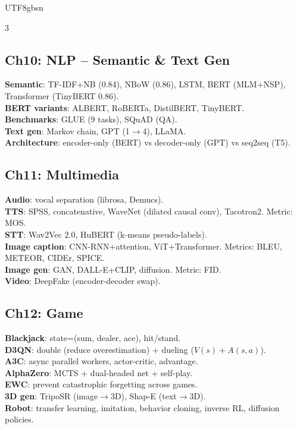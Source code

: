 \documentclass[9pt,landscape,a4paper]{article}
\begin{document}
\begin{CJK}{UTF8}{gbsn}
\begin{multicols}{3}
\subsection{Ch10: NLP -- Semantic \& Text Gen}
\textbf{Semantic}: TF-IDF+NB (0.84), NBoW (0.86), LSTM, BERT (MLM+NSP), Transformer (TinyBERT 0.86).\\
\textbf{BERT variants}: ALBERT, RoBERTa, DistilBERT, TinyBERT.\\
\textbf{Benchmarks}: GLUE (9 tasks), SQuAD (QA).\\
\textbf{Text gen}: Markov chain, GPT (1$\to$4), LLaMA.\\
\textbf{Architecture}: encoder-only (BERT) vs decoder-only (GPT) vs seq2seq (T5).

\subsection{Ch11: Multimedia}
\textbf{Audio}: vocal separation (librosa, Demucs).\\
\textbf{TTS}: SPSS, concatenative, WaveNet (dilated causal conv), Tacotron2. Metric: MOS.\\
\textbf{STT}: Wav2Vec 2.0, HuBERT (k-means pseudo-labels).\\
\textbf{Image caption}: CNN-RNN+attention, ViT+Transformer. Metrics: BLEU, METEOR, CIDEr, SPICE.\\
\textbf{Image gen}: GAN, DALL-E+CLIP, diffusion. Metric: FID.\\
\textbf{Video}: DeepFake (encoder-decoder swap).

\subsection{Ch12: Game}
\textbf{Blackjack}: state=(sum, dealer, ace), hit/stand.\\
\textbf{D3QN}: double (reduce overestimation) + dueling ($V(s)+A(s,a)$).\\
\textbf{A3C}: async parallel workers, actor-critic, advantage.\\
\textbf{AlphaZero}: MCTS + dual-headed net + self-play.\\
\textbf{EWC}: prevent catastrophic forgetting across games.\\
\textbf{3D gen}: TripoSR (image$\to$3D), Shap-E (text$\to$3D).\\
\textbf{Robot}: transfer learning, imitation, behavior cloning, inverse RL, diffusion policies.


\end{multicols}
\end{CJK}
\end{document}

